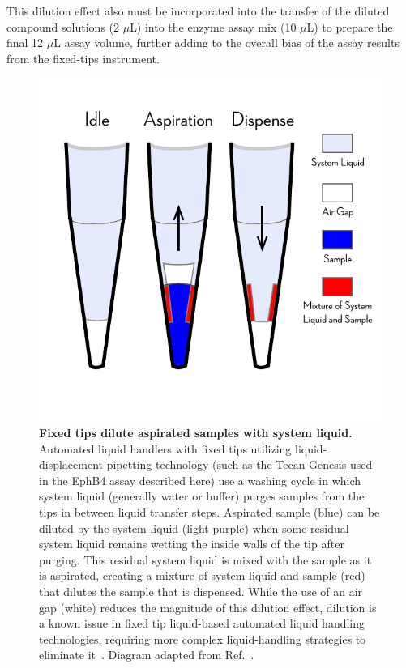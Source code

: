 \documentclass[aps,pre,twocolumn,nofootinbib,superscriptaddress,linenumbers]{revtex4-1}
\begin{document}
This dilution effect also must be incorporated into the transfer of the diluted compound solutions (2 $\mu$L) into the enzyme assay mix (10 $\mu$L) to prepare the final 12 $\mu$L assay volume, further adding to the overall bias of the assay results from the fixed-tips instrument. 

\begin{figure}[tb]
    \includegraphics[width=\columnwidth]{../figures/dilution_effect.pdf}

  \caption{{\bf Fixed tips dilute aspirated samples with system liquid.}
  Automated liquid handlers with fixed tips utilizing liquid-displacement pipetting technology (such as the Tecan Genesis used in the EphB4 assay described here) use a washing cycle in which system liquid (generally water or buffer) purges samples from the tips in between liquid transfer steps.
  Aspirated sample (blue) can be diluted by the system liquid (light purple) when some residual system liquid remains wetting the inside walls of the tip after purging.
  This residual system liquid is mixed with the sample as it is aspirated, creating a mixture of system liquid and sample (red) that dilutes the sample that is dispensed. 
  While the use of an air gap (white) reduces the magnitude of this dilution effect, dilution is a known issue in fixed tip liquid-based automated liquid handling technologies, requiring more complex liquid-handling strategies to eliminate it~\cite{gu_dilution_2007}. 
  Diagram adapted from Ref.~\cite{gu_dilution_2007}. 
  }
  \label{fig:dilution_effect}
\end{figure}
\end{document}
